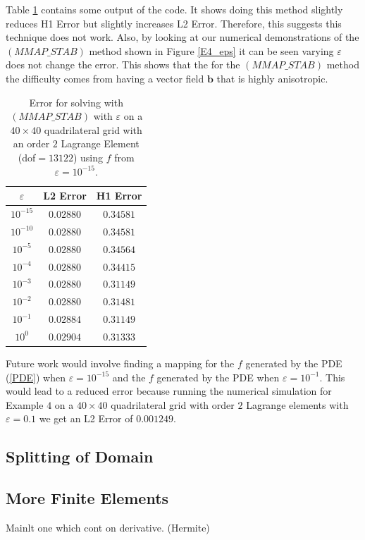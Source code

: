 \documentclass[12pt]{ociamthesis}
\begin{document}
Table \ref{Tbl_Map_f} contains some output of the code. It shows doing this method slightly reduces H1 Error but slightly increases L2 Error. Therefore, this suggests this technique does not work. Also, by looking at our numerical demonstrations of the $(MMAP\_STAB)$ method shown in Figure \ref{E4_eps} it can be seen varying $\varepsilon$ does not change the error. This shows that the for the $(MMAP\_STAB)$ method the difficulty comes from having a vector field $\mathbf{b}$ that is highly anisotropic. 
\begin{table}[H]
\begin{center}
\begin{tabular}{||ccc||}
\cline{2-3}
\multicolumn{1}{c|}{$\varepsilon$} & \multicolumn{1}{c|}{L2 Error} & \multicolumn{1}{c|}{H1 Error} \\
\hline 
\hline
$10^{-15}$  &  $0.02880$   &  $0.34581$\\
$10^{-10}$  &  $0.02880$   &  $0.34581$\\
$10^{-5}$  &  $0.02880$   &  $0.34564$\\
$10^{-4}$  &  $0.02880$   &  $0.34415$\\
$10^{-3}$  &  $0.02880$   &  $0.31149$\\
$10^{-2}$  &  $0.02880$   &  $0.31481$\\
$10^{-1}$  &  $0.02884$   &  $0.31149$\\
$10^{0}$  &  $0.02904$   &  $0.31333$\\
\hline
\end{tabular}
\end{center}
\caption{Error for solving with $(MMAP\_STAB)$ with $\varepsilon$ on a $40 \times 40$ quadrilateral grid with an order $2$ Lagrange Element (dof$=13122$) using $f$ from $\varepsilon=10^{-15}$.}
\label{Tbl_Map_f}
\end{table}
Future work would involve finding a mapping for the $f$ generated by the PDE (\ref{PDE}) when $\varepsilon=10^{-15}$ and the $f$ generated by the PDE when $\varepsilon=10^{-1}$. This would lead to a reduced error because running the numerical simulation for Example $4$ on a $40 \times 40$ quadrilateral grid with order $2$ Lagrange elements with $\varepsilon = 0.1$ we get an L2 Error of $0.001249$.

\subsection{Splitting of Domain}


\subsection{More Finite Elements}
Mainlt one which cont on derivative. (Hermite)
\end{document}

